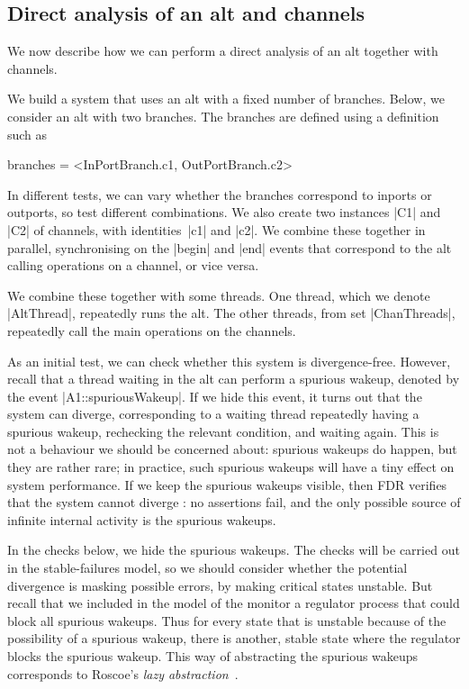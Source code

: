 \subsection{Direct analysis of an alt and channels}

\inlineCSP

We now describe how we can perform a direct analysis of an alt together with
channels.  

We build a system that uses an alt with a fixed number of branches.  Below, we
consider an alt with two branches.  The branches are defined using a
definition such as
%
\begin{cspm}
branches =  <InPortBranch.c1, OutPortBranch.c2>
\end{cspm}
%
In different tests, we can vary whether the branches correspond to inports or
outports, so test different combinations.  We also create two instances |C1|
and |C2| of channels, with identities~|c1| and |c2|.  We combine these
together in parallel, synchronising on the |begin| and |end| events that
correspond to the alt calling operations on a channel, or vice versa.

We combine these together with some threads.  One thread, which we denote
|AltThread|, repeatedly runs the alt.  The other threads, from set
|ChanThreads|, repeatedly call the main operations on the channels.

As an initial test, we can check whether this system is divergence-free.
However, recall that a thread waiting in the alt can perform a spurious
wakeup, denoted by the event |A1::spuriousWakeup|.  If we hide this event, it
turns out that the system can diverge, corresponding to a waiting thread
repeatedly having a spurious wakeup, rechecking the relevant condition, and
waiting again.  This is not a behaviour we should be concerned about: spurious
wakeups do happen, but they are rather rare; in practice, such spurious
wakeups will have a tiny effect on system performance.  If we keep the
spurious wakeups visible, then FDR verifies that the system cannot diverge
: no assertions fail, and the only possible source of
infinite internal activity is the spurious wakeups.

In the checks below, we hide the spurious wakeups.  The checks will be carried
out in the stable-failures model, so we should consider whether the potential
divergence is masking possible errors, by making critical states unstable.
But recall that we included in the model of the monitor a regulator process
that could block all spurious wakeups.  Thus for every state that is unstable
because of the possibility of a spurious wakeup, there is another, stable
state where the regulator blocks the spurious wakeup.  This way of abstracting
the spurious wakeups corresponds to Roscoe's \emph{lazy
  abstraction}~\cite{awr:UCS}. 

